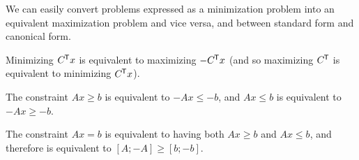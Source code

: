 \begin{rmk}
    We can easily convert problems expressed as a minimization problem into an equivalent maximization problem and vice versa, and between standard form and canonical form.
\end{rmk}

\begin{prop}
    Minimizing $C^{\mkern-1.5mu\mathsf{T}}x$ is equivalent to maximizing $-C^{\mkern-1.5mu\mathsf{T}}x$ (and so maximizing $C^{\mkern-1.5mu\mathsf{T}}$ is equivalent to minimizing $C^{\mkern-1.5mu\mathsf{T}}x$).
\end{prop}

\begin{prop}
    The constraint $Ax \geq b$ is equivalent to $-Ax \leq -b$, and $Ax \leq b$ is equivalent to $-Ax \geq -b$.
\end{prop}

\begin{prop}
    The constraint $Ax = b$ is equivalent to having both $Ax \geq b$ and $Ax \leq b$, and therefore is equivalent to $[A; -A] \geq [b; -b]$.
\end{prop}
